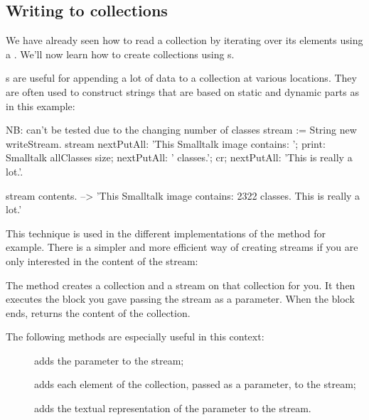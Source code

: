 \documentclass[a4paper,10pt,twoside]{book}
\begin{document}
\subsection{Writing to collections}

We have already seen how to read a collection by iterating over its
elements using a . We'll now learn how to create
collections using s.

s are useful for appending a lot of data to a collection at various locations. They are often used to construct strings that are based on static and dynamic parts as in this example:

\begin{code}{NB: can't be tested due to the changing number of classes}
stream := String new writeStream.
stream
  nextPutAll: 'This Smalltalk image contains: ';
  print: Smalltalk allClasses size;
  nextPutAll: ' classes.';
  cr;
  nextPutAll: 'This is really a lot.'.

stream contents. --> 'This Smalltalk image contains: 2322 classes.
This is really a lot.'
\end{code}

This technique is used in the different implementations of the method
 for example. There is a simpler and more efficient way
of creating streams if you are only interested in the content of the
stream:


The method   creates a collection and a stream on
that collection for you. It then executes the block you gave passing
the stream as a parameter. When the block ends, 
returns the content of the collection.

The following  methods are especially useful in this context:

\begin{description}
\item[] adds the parameter to the stream;
\item[] adds each element of the collection, passed as a
  parameter, to the stream;
\item[] adds the textual representation of the parameter to the
  stream.
\end{description}
\end{document}
